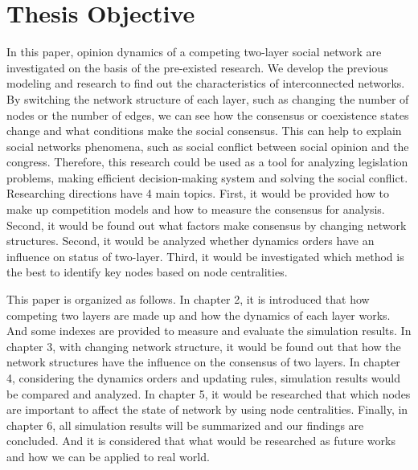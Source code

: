 \section{Thesis Objective}
In this paper, opinion dynamics of a competing two-layer social network are investigated on the basis of the pre-existed research\parencite{alvarez2016, gomez2015, diep2017, rocca2014}. We develop the previous modeling and research to find out the characteristics of interconnected networks. By switching the network structure of each layer, such as changing the number of nodes or the number of edges, we can see how the consensus or coexistence states change and what conditions make the social consensus. This can help to explain social networks phenomena, such as social conflict between social opinion and the congress. Therefore, this research could be used as a tool for analyzing legislation problems, making efficient decision-making system and solving the social conflict. 
Researching directions have 4 main topics. First, it would be provided how to make up competition models and how to measure the consensus for analysis. Second, it would be found out what factors make consensus by changing network structures. Second, it would be analyzed whether dynamics orders have an influence on status of two-layer. Third, it would be investigated which method is the best to identify key nodes based on node centralities.

This paper is organized as follows. In chapter 2, it is introduced that how competing two layers are made up and how the dynamics of each layer works. And some indexes are provided to measure and evaluate the simulation results. In chapter 3, with changing network structure, it would be found out that how the network structures have the influence on the consensus of two layers. In chapter 4, considering the dynamics orders and updating rules, simulation results would be compared and analyzed. In chapter 5, it would be researched that which nodes are important to affect the state of network by using node centralities. Finally, in chapter 6, all simulation results will be summarized and our findings are concluded. And it is considered that what would be researched as future works and how we can be applied to real world. 


